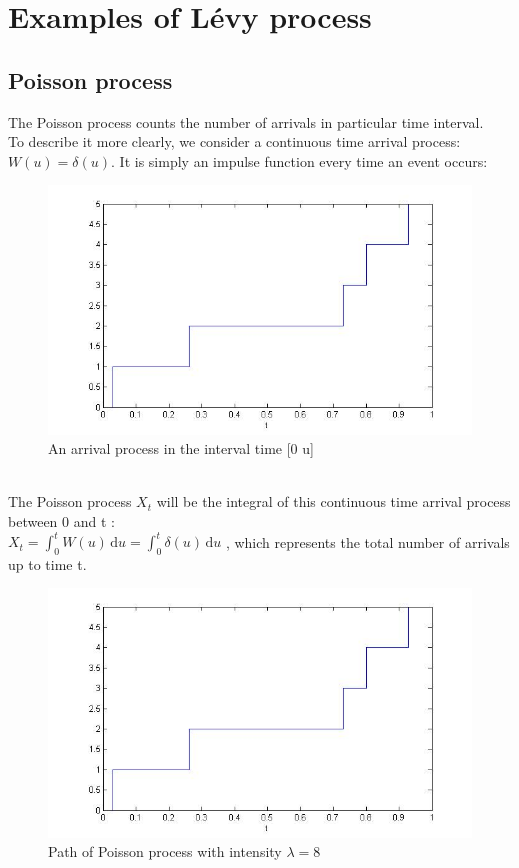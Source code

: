 \documentclass[12pt]{report}
\begin{document}
\section{Examples of Lévy process }
\subsection{Poisson process}
The Poisson process counts the number of arrivals in particular time interval.\\
To describe it more clearly, we consider a continuous time arrival process: $ W(u)=\delta(u)$. It is simply an impulse function
 every time an event occurs:
\begin{figure}[h]

\centering
\includegraphics[scale=0.7]{poisson.jpg} 
\caption{An arrival process in the interval time [0 u]}
\end{figure}
\\
The Poisson process $X_t$ will be the integral of this continuous time arrival process between 0 and t :\\
$X_t=\displaystyle \int_{0}^{t} W(u) \, \mathrm{d}u=\displaystyle \int_{0}^{t} \delta(u) \, \mathrm{d}u$ , which represents the total number of arrivals up to  time t.\\

\begin{figure}[h]

\centering
\includegraphics[scale=0.7]{poisson.jpg} 
\caption{Path of Poisson process with intensity $\lambda = 8$}
\end{figure}
\end{document}
